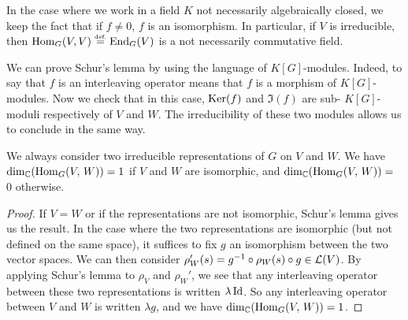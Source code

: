  
\begin{rem}
In the case where we work in a field $K$ not necessarily algebraically closed, we keep the fact that if $ f \neq 0 $, $ f $ is an isomorphism. In particular, if $V$ is irreducible, then $ \operatorname{Hom}_G (V, V) \stackrel{\mbox{\upshape\tiny def.}}{=} \operatorname{End}_G (V) $ is a not necessarily commutative field.
\end{rem}
 
 
\begin{rem}
We can prove Schur's lemma by using the language of $ K[G]$-modules. Indeed, to say that $ f $ is an interleaving operator means that $ f $ is a morphism of $ K[G]$-modules. Now we check that in this case, $ \operatorname{Ker} (f) $ and $ \Im (f) $ are sub- $ K[G] $-moduli respectively of $V$ and $ W $. The irreducibility of these two modules allows us to conclude in the same way.
\end{rem}
 
 
\begin{cor}
\label{cor-dim-invariants}
\label{notation-84} We always consider two irreducible representations of $G$ on $V$ and $ W $. We have $ \dim_{\mathbb{C}} (\operatorname{Hom}_G (V, \, W)) = 1 $ if $V$ and $ W $ are isomorphic, and $ \dim_{\mathbb{C}} (\operatorname{Hom}_G (V, \, W)) = $ 0 otherwise.
\end{cor}
\begin{proof}
If $ V = W $ or if the representations are not isomorphic, Schur's lemma gives us the result. In the case where the two representations are isomorphic (but not defined on the same space), it suffices to fix $ g $ an isomorphism between the two vector spaces. We can then consider $ \rho_W'(s) = g^{-1} \circ \rho_W (s) \circ g \in \mathcal{L} (V) $. By applying Schur's lemma to $ \rho_V $ and $ \rho_W'$, we see that any interleaving operator between these two representations is written $ \lambda \operatorname{Id} $. So any interleaving operator between $V$ and $ W $ is written $ \lambda g $, and we have $ \dim_{\mathbb{C}} (\operatorname{Hom}_G (V, \, W)) = 1 $.
\end{proof}
 
